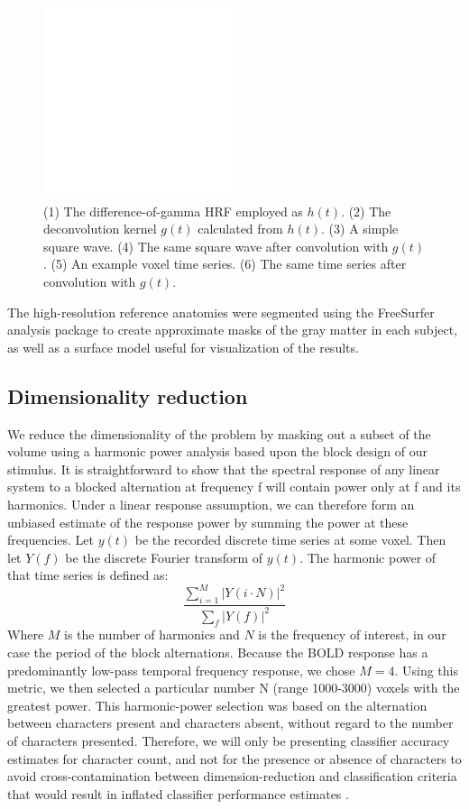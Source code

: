 \documentclass[final]{article}
\begin{document}
\begin{figure}[!htbp]
\centering
\includegraphics[width=0.5\textwidth]{figures/placeholder}
\caption{(1) The difference-of-gamma HRF employed as $h(t)$. (2) The deconvolution kernel $g(t)$ calculated from $h(t)$. (3) A simple square wave. (4) The same square wave after convolution with $g(t)$. (5) An example voxel time series. (6) The same time series after convolution with $g(t)$.}
\label{fig:data-split}
\end{figure}

The high-resolution reference anatomies were segmented using the FreeSurfer analysis package 
\cite{FreeSurfer} to create approximate masks of the gray matter in each subject, as well as 
a surface model useful for visualization of the results.

\subsection{Dimensionality reduction}
We reduce the dimensionality of the problem by masking out a subset of the volume using a harmonic power analysis based upon the block design of our stimulus. 
It is straightforward to show that the spectral response of any linear system to a blocked alternation at frequency f will contain power only at f and its harmonics. 
Under a linear response assumption, we can therefore form an unbiased estimate of the response power by summing the power at these frequencies. 
Let $y(t)$ be the recorded discrete time series at some voxel.
Then let $Y(f)$ be the discrete Fourier transform of $y(t)$.
The harmonic power of that time series is defined as:
\begin{equation}
\frac{\sum_{i = 1}^{M}{\left|Y(i \cdot N)\right|^{2}}}{\sum_{f}{\left|Y(f)\right|^{2}}}
\end{equation}
Where $M$ is the number of harmonics and $N$ is the frequency of interest, in our case the period of the block alternations. 
Because the BOLD response has a predominantly low-pass temporal frequency response, we chose $M = 4$. 
Using this metric, we then selected a particular number N (range 1000-3000) voxels with the greatest power. 
This harmonic-power selection was based on the alternation between characters present and characters 
absent, without regard to the number of characters presented. Therefore, we will only be presenting 
classifier accuracy estimates for character count, and not for the presence or absence of 
characters to avoid cross-contamination between dimension-reduction and  classification criteria that 
would result in inflated classifier performance estimates \cite{CrossContamination}.
\end{document}
